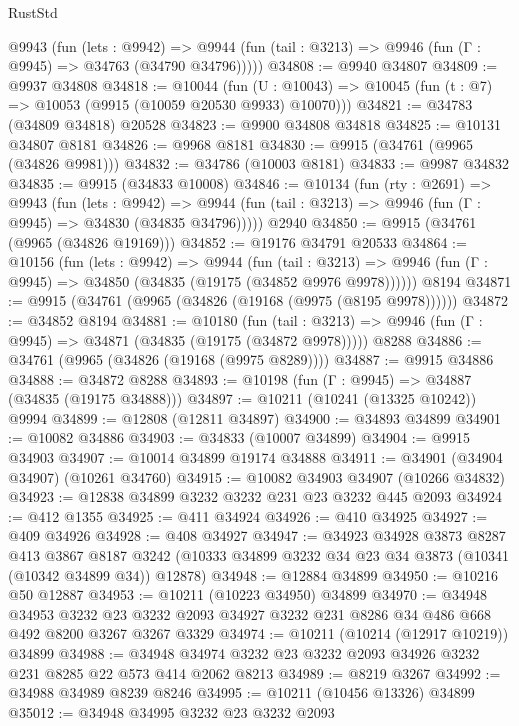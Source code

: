 \begin{lexlean}{RustStd}
\begin{coremodule}
{\begin{coremodule}
{{{{{{{{{{{{{{{{{{{{{{{{{    @9943
      (fun (lets : @9942) =>
      @9944 (fun (tail : @3213) => @9946 (fun (Γ : @9945) => @34763 (@34790 @34796)))))
@34808 := @9940 @34807
@34809 := @9937 @34808
@34818 := @10044
    (fun (U : @10043) => @10045 (fun (t : @7) => @10053 (@9915 (@10059 @20530 @9933) @10070)))
@34821 := @34783 (@34809 @34818) @20528
@34823 := @9900 @34808 @34818
@34825 := @10131 @34807 @8181
@34826 := @9968 @8181
@34830 := @9915 (@34761 (@9965 (@34826 @9981)))
@34832 := @34786 (@10003 @8181)
@34833 := @9987 @34832
@34835 := @9915 (@34833 @10008)
@34846 := @10134
    (fun (rty : @2691) =>
    @9943
      (fun (lets : @9942) =>
      @9944 (fun (tail : @3213) => @9946 (fun (Γ : @9945) => @34830 (@34835 @34796)))))
    @2940
@34850 := @9915 (@34761 (@9965 (@34826 @19169)))
@34852 := @19176 @34791 @20533
@34864 := @10156
    (fun (lets : @9942) =>
    @9944
      (fun (tail : @3213) =>
      @9946 (fun (Γ : @9945) => @34850 (@34835 (@19175 (@34852 @9976 @9978))))))
    @8194
@34871 := @9915 (@34761 (@9965 (@34826 (@19168 (@9975 (@8195 @9978))))))
@34872 := @34852 @8194
@34881 := @10180
    (fun (tail : @3213) => @9946 (fun (Γ : @9945) => @34871 (@34835 (@19175 (@34872 @9978)))))
    @8288
@34886 := @34761 (@9965 (@34826 (@19168 (@9975 @8289))))
@34887 := @9915 @34886
@34888 := @34872 @8288
@34893 := @10198 (fun (Γ : @9945) => @34887 (@34835 (@19175 @34888)))
@34897 := @10211 (@10241 (@13325 @10242)) @9994
@34899 := @12808 (@12811 @34897)
@34900 := @34893 @34899
@34901 := @10082 @34886
@34903 := @34833 (@10007 @34899)
@34904 := @9915 @34903
@34907 := @10014 @34899 @19174 @34888
@34911 := @34901 (@34904 @34907) (@10261 @34760)
@34915 := @10082 @34903 @34907 (@10266 @34832)
@34923 := @12838 @34899 @3232 @3232 @231 @23 @3232 @445 @2093
@34924 := @412 @1355
@34925 := @411 @34924
@34926 := @410 @34925
@34927 := @409 @34926
@34928 := @408 @34927
@34947 := @34923
    @34928
    @3873
    @8287
    @413
    @3867
    @8187
    @3242
    (@10333 @34899 @3232 @34 @23 @34 @3873 (@10341 (@10342 @34899 @34)) @12878)
@34948 := @12884 @34899
@34950 := @10216 @50 @12887
@34953 := @10211 (@10223 @34950) @34899
@34970 := @34948
    @34953
    @3232
    @23
    @3232
    @2093
    @34927
    @3232
    @231
    @8286
    @34
    @486
    @668
    @492
    @8200
    @3267
    @3267
    @3329
@34974 := @10211 (@10214 (@12917 @10219)) @34899
@34988 := @34948 @34974 @3232 @23 @3232 @2093 @34926 @3232 @231 @8285 @22 @573 @414 @2062 @8213
@34989 := @8219 @3267
@34992 := @34988 @34989 @8239 @8246
@34995 := @10211 (@10456 @13326) @34899
@35012 := @34948
    @34995
    @3232
    @23
    @3232
    @2093
}}}}}}}}}}}}}}}}}}}}}}}}}
\end{coremodule}}
\end{coremodule}
\end{lexlean}

